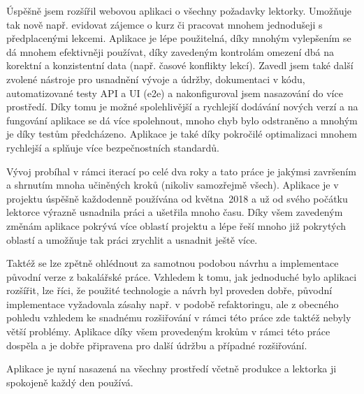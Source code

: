 Úspěšně jsem rozšířil webovou aplikaci o všechny požadavky lektorky. Umožňuje tak nově např. evidovat zájemce o kurz či pracovat mnohem jednodušeji s předplacenými lekcemi. Aplikace je lépe použitelná, díky mnohým vylepšením se dá mnohem efektivněji používat, díky zavedeným kontrolám omezení dbá na korektní a konzistentní data (např. časové konflikty lekcí). Zavedl jsem také další zvolené nástroje pro usnadnění vývoje a údržby, dokumentaci v kódu, automatizované testy API a UI (e2e) a nakonfiguroval jsem nasazování do více prostředí. Díky tomu je možné spolehlivější a rychlejší dodávání nových verzí a na fungování aplikace se dá více spolehnout, mnoho chyb bylo odstraněno a mnohým je díky testům předcházeno. Aplikace je také díky pokročilé optimalizaci mnohem rychlejší a splňuje více bezpečnostních standardů.

Vývoj probíhal v rámci iterací po celé dva roky a tato práce je jakýmsi završením a shrnutím mnoha učiněných kroků (nikoliv samozřejmě všech). Aplikace je v projektu úspěšně každodenně používána od května~2018 a už od svého počátku lektorce výrazně usnadnila práci a ušetřila mnoho času. Díky všem zavedeným změnám aplikace pokrývá více oblastí projektu a lépe řeší mnoho již pokrytých oblastí a umožňuje tak práci zrychlit a usnadnit ještě více.

Taktéž se lze zpětně ohlédnout za samotnou podobou návrhu a implementace původní verze z bakalářské práce. Vzhledem k tomu, jak jednoduché bylo aplikaci rozšířit, lze říci, že použité technologie a návrh byl proveden dobře, původní implementace vyžadovala zásahy např. v podobě refaktoringu, ale z obecného pohledu vzhledem ke snadnému rozšiřování v rámci této práce zde taktéž nebyly větší problémy. Aplikace díky všem provedeným krokům v rámci této práce dospěla a je dobře připravena pro další údržbu a případné rozšiřování.

Aplikace je nyní nasazená na všechny prostředí včetně produkce a lektorka ji spokojeně každý den používá. 
